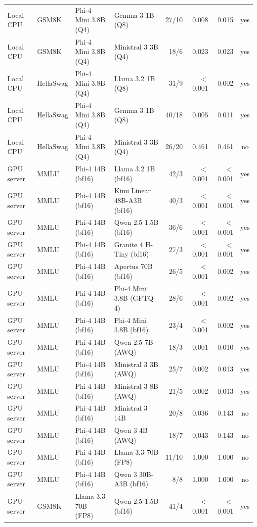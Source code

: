\begin{longtable}{@{}l l l l r r r c@{}}
Local CPU & GSM8K & Phi-4 Mini 3.8B (Q4) & Gemma 3 1B (Q8) & 27/10 & 0.008 & 0.015 & yes \\
Local CPU & GSM8K & Phi-4 Mini 3.8B (Q4) & Ministral 3 3B (Q4) & 18/6 & 0.023 & 0.023 & yes \\
\midrule
Local CPU & HellaSwag & Phi-4 Mini 3.8B (Q4) & Llama 3.2 1B (Q8) & 31/9 & $<$0.001 & 0.002 & yes \\
Local CPU & HellaSwag & Phi-4 Mini 3.8B (Q4) & Gemma 3 1B (Q8) & 40/18 & 0.005 & 0.011 & yes \\
Local CPU & HellaSwag & Phi-4 Mini 3.8B (Q4) & Ministral 3 3B (Q4) & 26/20 & 0.461 & 0.461 & no \\
\midrule
GPU server & MMLU & Phi-4 14B (bf16) & Llama 3.2 1B (bf16) & 42/3 & $<$0.001 & $<$0.001 & yes \\
GPU server & MMLU & Phi-4 14B (bf16) & Kimi Linear 48B-A3B (bf16) & 40/3 & $<$0.001 & $<$0.001 & yes \\
GPU server & MMLU & Phi-4 14B (bf16) & Qwen 2.5 1.5B (bf16) & 36/6 & $<$0.001 & $<$0.001 & yes \\
GPU server & MMLU & Phi-4 14B (bf16) & Granite 4 H-Tiny (bf16) & 27/3 & $<$0.001 & $<$0.001 & yes \\
GPU server & MMLU & Phi-4 14B (bf16) & Apertus 70B (bf16) & 26/5 & $<$0.001 & 0.002 & yes \\
GPU server & MMLU & Phi-4 14B (bf16) & Phi-4 Mini 3.8B (GPTQ-4) & 28/6 & $<$0.001 & 0.002 & yes \\
GPU server & MMLU & Phi-4 14B (bf16) & Phi-4 Mini 3.8B (bf16) & 23/4 & $<$0.001 & 0.002 & yes \\
GPU server & MMLU & Phi-4 14B (bf16) & Qwen 2.5 7B (AWQ) & 18/3 & 0.001 & 0.010 & yes \\
GPU server & MMLU & Phi-4 14B (bf16) & Ministral 3 3B (AWQ) & 25/7 & 0.002 & 0.013 & yes \\
GPU server & MMLU & Phi-4 14B (bf16) & Ministral 3 8B (AWQ) & 21/5 & 0.002 & 0.013 & yes \\
GPU server & MMLU & Phi-4 14B (bf16) & Ministral 3 14B & 20/8 & 0.036 & 0.143 & no \\
GPU server & MMLU & Phi-4 14B (bf16) & Qwen 3 4B (AWQ) & 18/7 & 0.043 & 0.143 & no \\
GPU server & MMLU & Phi-4 14B (bf16) & Llama 3.3 70B (FP8) & 11/10 & 1.000 & 1.000 & no \\
GPU server & MMLU & Phi-4 14B (bf16) & Qwen 3 30B-A3B (bf16) & 8/8 & 1.000 & 1.000 & no \\
\midrule
GPU server & GSM8K & Llama 3.3 70B (FP8) & Qwen 2.5 1.5B (bf16) & 41/4 & $<$0.001 & $<$0.001 & yes \\

\end{longtable}
